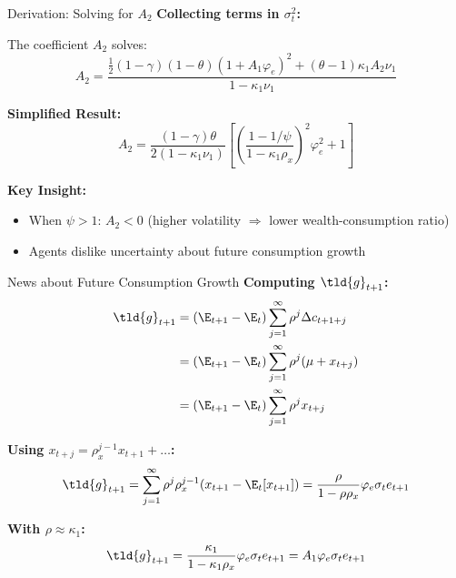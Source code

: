 \documentclass{beamer}
\begin{document}
\begin{frame}{Derivation: Solving for $A_2$}
    \textbf{Collecting terms in $\sigma_t^2$:}
    
    The coefficient $A_2$ solves:
    \begin{equation}
        A_2 = \frac{\frac{1}{2}(1-\gamma)(1-\theta)(1+A_1\varphi_e)^2 + (\theta-1)\kappa_1 A_2 \nu_1}{1 - \kappa_1 \nu_1}
    \end{equation}
    
    \textbf{Simplified Result:}
    \begin{equation}
        A_2 = \frac{(1-\gamma)\theta}{2(1-\kappa_1\nu_1)} \left[ \left(\frac{1-1/\psi}{1-\kappa_1\rho_x}\right)^2 \varphi_e^2 + 1 \right]
    \end{equation}
    
    \vspace{0.3cm}
    \textbf{Key Insight:}
    \begin{itemize}
        \item When $\psi > 1$: $A_2 < 0$ (higher volatility $\Rightarrow$ lower wealth-consumption ratio)
        \item Agents dislike uncertainty about future consumption growth
    \end{itemize}
\end{frame}

\begin{frame}{News about Future Consumption Growth}
    \textbf{Computing $\tld{g}_{t+1}$:}
    \begin{align}
        \tld{g}_{t+1} &= (\E_{t+1} - \E_t) \sum_{j=1}^{\infty} \rho^j \Delta c_{t+1+j} \nonumber \\
        &= (\E_{t+1} - \E_t) \sum_{j=1}^{\infty} \rho^j (\mu + x_{t+j}) \nonumber \\
        &= (\E_{t+1} - \E_t) \sum_{j=1}^{\infty} \rho^j x_{t+j}
    \end{align}
    
    \textbf{Using $x_{t+j} = \rho_x^{j-1} x_{t+1} + \ldots$:}
    \begin{equation}
        \tld{g}_{t+1} = \sum_{j=1}^{\infty} \rho^j \rho_x^{j-1} (x_{t+1} - \E_t[x_{t+1}]) = \frac{\rho}{1-\rho \rho_x} \varphi_e \sigma_t e_{t+1}
    \end{equation}
    
    \textbf{With $\rho \approx \kappa_1$:}
    \begin{equation}
        \tld{g}_{t+1} = \frac{\kappa_1}{1-\kappa_1 \rho_x} \varphi_e \sigma_t e_{t+1} = A_1 \varphi_e \sigma_t e_{t+1}
    \end{equation}
\end{frame}
\end{document}
